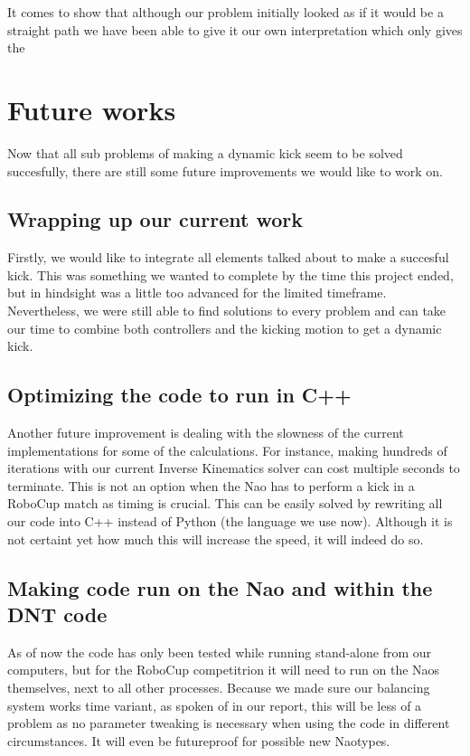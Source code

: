 \documentclass[a4paper]{article}
\begin{document}
It comes to show that although our problem initially looked as if it would be a
straight path we have been able to give it our own interpretation which only
gives the 

\section{Future works}
Now that all sub problems of making a dynamic kick seem to be solved succesfully, there are still some future improvements we would like to work on.

\subsection{Wrapping up our current work}
Firstly, we would like to integrate all elements talked about to make a succesful kick. This
was something we wanted to complete by the time this project ended, but in
hindsight was a little too advanced for the limited
timeframe. Nevertheless, we were still  able to find
solutions to every problem and can take our time to combine both controllers
and the kicking motion to get a dynamic kick.

\subsection{Optimizing the code to run in C++}
Another future improvement is dealing with the slowness of the current
implementations for some of the calculations. For instance, making hundreds of 
iterations with our current Inverse Kinematics solver can cost multiple
seconds to terminate.
This is not an option when the Nao has to perform a kick in a RoboCup match
as timing is crucial. This
can be easily solved by rewriting all our code into C++ instead of Python (the
language we use now). Although it is not certaint yet how much this will
increase the speed, it will indeed do so.

\subsection{Making code run on the Nao and within the DNT code} 
As of now the code has only been tested while running stand-alone from our computers, but
for the RoboCup competitrion it will need to run on the Naos themselves, next to all
other processes. Because we
made sure our balancing system works time variant, as spoken of in our report, this
will be less of a problem as no parameter tweaking is necessary when using the
code in different circumstances. It will even be futureproof for possible new
Naotypes.
\end{document}
